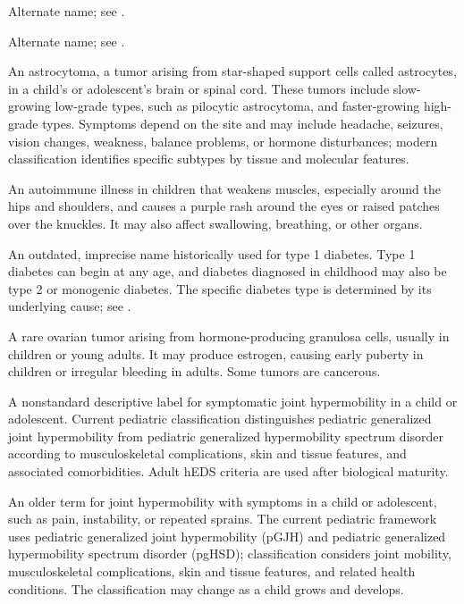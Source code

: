  Alternate name; see .

 Alternate name; see .

 An astrocytoma, a tumor arising from star-shaped support cells called astrocytes, in a child’s or adolescent’s brain or spinal cord. These tumors include slow-growing low-grade types, such as pilocytic astrocytoma, and faster-growing high-grade types. Symptoms depend on the site and may include headache, seizures, vision changes, weakness, balance problems, or hormone disturbances; modern classification identifies specific subtypes by tissue and molecular features.

 An autoimmune illness in children that weakens muscles, especially around the hips and shoulders, and causes a purple rash around the eyes or raised patches over the knuckles. It may also affect swallowing, breathing, or other organs.

 An outdated, imprecise name historically used for type 1 diabetes.
Type 1 diabetes can begin at any age, and diabetes diagnosed in childhood may also be type 2
or monogenic diabetes. The specific diabetes type is determined by its underlying cause;
see .

 A rare ovarian tumor arising from hormone-producing granulosa cells, usually in children or young adults. It may produce estrogen, causing early puberty in children or irregular bleeding in adults. Some tumors are cancerous.

 A nonstandard descriptive label for
symptomatic joint hypermobility in a child or adolescent. Current pediatric classification
distinguishes pediatric generalized joint hypermobility from pediatric generalized
hypermobility spectrum disorder according to musculoskeletal complications, skin and tissue
features, and associated comorbidities. Adult hEDS criteria are used after biological maturity.

 An older term for joint hypermobility with symptoms in a child or adolescent, such as pain, instability, or repeated sprains. The current pediatric framework uses pediatric generalized joint hypermobility (pGJH) and pediatric generalized hypermobility spectrum disorder (pgHSD); classification considers joint mobility, musculoskeletal complications, skin and tissue features, and related health conditions. The classification may change as a child grows and develops.

